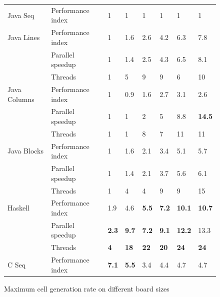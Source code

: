\documentclass[a4paper]{article}
\begin{document}
\begin{figure}[h]
\begin{tabular}{  ll | l  l  l  l  l  l }
            Java Seq & Performance index & 1 & 1 & 1 & 1 & 1 & 1 \\
            Java Lines
                & Performance index & 1 & 1.6 & 2.6 & 4.2 & 6.3 & 7.8 \\
                & Parallel speedup  & 1 & 1.4 & 2.5 & 4.3 & 6.5 & 8.1 \\
                & Threads           & 1 & 5   & 9   & 9   & 6   & 10 \\
            Java Columns
                & Performance index & 1 & 0.9 & 1.6 & 2.7 & 3.1 & 2.6 \\
                & Parallel speedup  & 1 & 1   & 2   & 5   & 8.8 
                                    & \textbf{14.5} \\
                & Threads           & 1 & 1   & 8   & 7   & 11  & 11 \\
            Java Blocks
                & Performance index & 1 & 1.6 & 2.1 & 3.4
                                    & 5.1 & 5.7 \\
                & Parallel speedup  & 1 & 1.4 & 2.1 & 3.7
                                    & 5.6 & 6.1 \\
                & Threads           & 1 & 4   & 4   & 9
                                    & 9 & 15 \\
            Haskell
                & Performance index & 1.9 & 4.6
                                    & \textbf{5.5}  & \textbf{7.2}
                                    & \textbf{10.1} & \textbf{10.7} \\
                & Parallel speedup  & \textbf{2.3}  & \textbf{9.7}
                                    & \textbf{7.2}  & \textbf{9.1}
                                    & \textbf{12.2} & 13.3 \\
                & Threads           & \textbf{4}    & \textbf{18}
                                    & \textbf{22}   & \textbf{20}
                                    & \textbf{24}   & \textbf{24} \\
            C Seq & Performance index & \textbf{7.1} & \textbf{5.5}
                                      & 3.4 & 4.4 & 4.7 & 4.7 \\
        \end{tabular}

        \caption{
            Maximum cell generation rate on different board sizes
            \label{fig:board_size_impact}
        }
    \end{figure}
\end{document}
